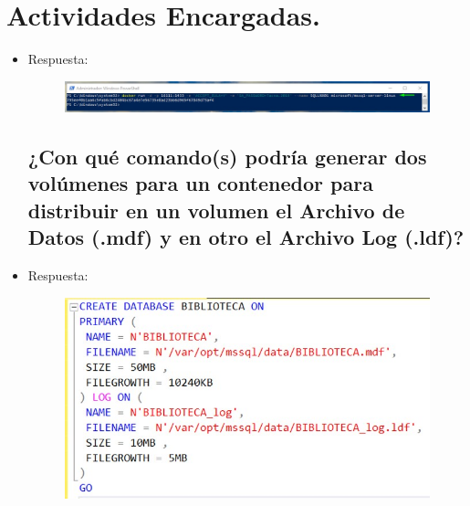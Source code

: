\section{Actividades Encargadas.}

	\begin{itemize}
		\subsection{¿Con qué comando(s) exportaría la imagen de Docker de Microsoft SQL Server a otra PC o Servidor?}
			\item Respuesta:
				\begin{figure}[htb]
					\begin{center}
						\includegraphics[width=19cm]{./Imagenes/Comando05}
					\end{center}
				\end{figure}
		\subsection{¿Con qué comando(s) podría generar dos volúmenes para un contenedor para distribuir en un volumen el Archivo de Datos (.mdf) y en otro el Archivo Log (.ldf)?}
			\item Respuesta:
				\begin{figure}[htb]
					\begin{center}
						\includegraphics[width=16cm]{./Imagenes/CrearDataBase}
					\end{center}
				\end{figure}
				\vspace{5cm}

\end{itemize}
